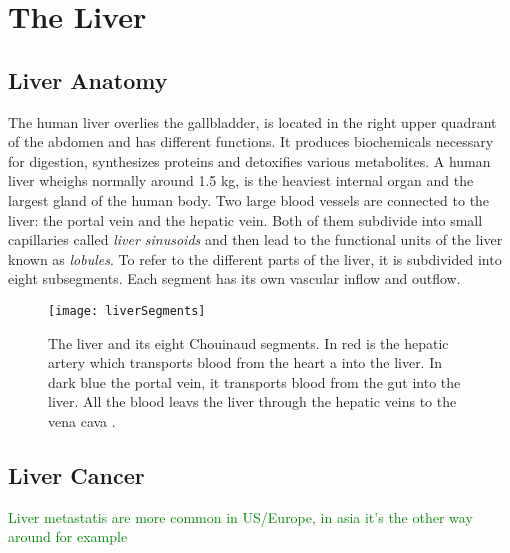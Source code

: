 


\section{The Liver} 
\subsection{Liver Anatomy}
The human liver overlies the gallbladder, is located in the right upper quadrant of the abdomen and has
different functions. It produces biochemicals necessary for digestion,
synthesizes proteins and detoxifies various metabolites. A human liver wheighs
normally around 1.5 kg, is the heaviest internal organ and the largest gland
of the human body. Two large blood vessels are connected to the liver: the
portal vein and the hepatic vein. Both of them subdivide into small
capillaries called \textit{liver sinusoids} and then lead to the functional
units of the liver known as \textit{lobules}. To refer to the different parts of
the liver, it is subdivided into eight subsegments. Each segment has its own
vascular inflow and outflow.
\begin{figure}[H]
  \centering
 \texttt{[image: liverSegments]}
  \caption{The liver and its eight Chouinaud segments. In red is the hepatic
    artery which transports blood from the heart a into the liver. In dark blue
    the portal vein, it transports blood from the gut into the liver. All the
    blood leavs the liver through the hepatic veins to the vena cava \cite{siriwardena2014management}.}
  \label{fig:liverSegments}
\end{figure}

\subsection{Liver Cancer}
\textcolor{green}{Liver metastatis are more common in US/Europe, in asia it's the other way around for example}

